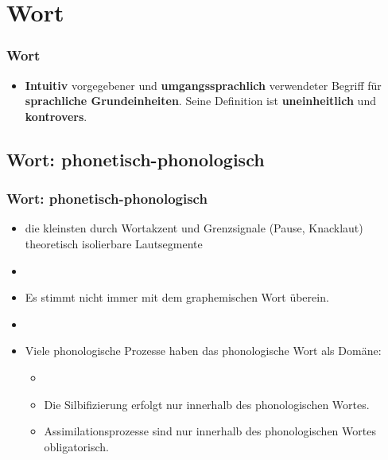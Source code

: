 \section{Wort}


\begin{frame}
\frametitle{Wort}

\begin{itemize}
	\item \textbf{Intuitiv} vorgegebener und \textbf{umgangssprachlich} verwendeter
Begriff für \textbf{sprachliche Grundeinheiten}. Seine Definition ist
\textbf{uneinheitlich} und \textbf{kontrovers}.
\end{itemize}


\end{frame}


\subsection{Wort: phonetisch-phonologisch}


\begin{frame}
\frametitle{Wort: phonetisch-phonologisch}

\begin{itemize}
	\item die kleinsten durch Wortakzent und Grenzsignale (Pause, Knacklaut) theoretisch isolierbare Lautsegmente
	\item[]
	\item Es stimmt nicht immer mit dem graphemischen Wort überein.
	\item[]
	\item Viele phonologische Prozesse haben das phonologische Wort
als Domäne:
	
	\begin{itemize}
		\item[]
		\item Die Silbifizierung erfolgt nur innerhalb des phonologischen
Wortes.
		\item Assimilationsprozesse sind nur innerhalb des phonologischen
Wortes obligatorisch.
	\end{itemize}
\end{itemize}


\end{frame}


